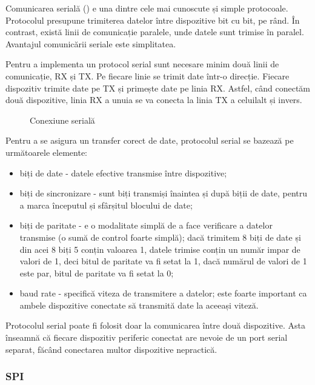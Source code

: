 Comunicarea serială () e una dintre cele mai cunoscute și simple protocoale.
Protocolul presupune trimiterea datelor între dispozitive bit cu bit, pe rând.
În contrast, există linii de comunicație paralele, unde datele sunt trimise în
paralel. Avantajul comunicării seriale este simplitatea.

Pentru a implementa un protocol serial sunt necesare minim două linii de
comunicație, RX și TX. Pe fiecare linie se trimit date într-o direcție. Fiecare
dispozitiv trimite date pe TX și primește date pe linia RX. Astfel, când
conectăm două dispozitive, linia RX a unuia se va conecta la linia TX a
celuilalt și invers.

\begin{figure}[htbp]
	\centering
	\def\svgwidth{\columnwidth}
        
	\caption{Conexiune serială}
	\label{fig:embed:serial}
\end{figure}

Pentru a se asigura un transfer corect de date, protocolul serial se bazează pe
următoarele elemente:

\begin{itemize}
	\item biți de date - datele efective transmise între dispozitive;
	\item biți de sincronizare - sunt biți transmiși înaintea și după biții
		de date, pentru a marca începutul și sfârșitul blocului de date;
	\item biți de paritate - e o modalitate simplă de a face verificare a
		datelor transmise (o sumă de control foarte simplă); dacă trimitem 8
		biți de date și din acei 8 biți 5 conțin valoarea 1, datele
		trimise conțin un număr impar de valori de 1, deci bitul de
		paritate va fi setat la 1, dacă numărul de valori de 1 este par,
		bitul de paritate va fi setat la 0;
	\item baud rate - specifică viteza de transmitere a datelor; este foarte
		important ca ambele dispozitive conectate să transmită date la
		aceeași viteză.
\end{itemize}

Protocolul serial poate fi folosit doar la comunicarea între două dispozitive.
Asta înseamnă că fiecare dispozitiv periferic conectat are nevoie de un port
serial separat, făcând conectarea multor dispozitive nepractică.

\subsubsection{SPI}
\label{sec:embed:bus:wired:spi}

